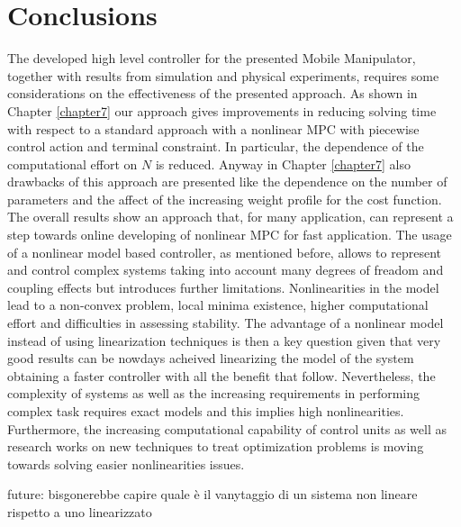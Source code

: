 
\chapter{Conclusions}
\label{conclusions}

The developed high level controller for the presented Mobile Manipulator, together with results from simulation and physical experiments, requires some considerations on the effectiveness of the presented approach. As shown in Chapter \ref{chapter7} our approach gives improvements in reducing solving time with respect to a standard approach with a nonlinear MPC with piecewise control action and terminal constraint. In particular, the dependence of the computational effort on $N$ is reduced. Anyway in Chapter \ref{chapter7} also drawbacks of this approach are presented like the dependence on the number of parameters and the affect of the increasing weight profile for the cost function. The overall results show an approach that, for many application, can represent a step towards online developing of nonlinear MPC for fast application. The usage of a nonlinear model based controller, as mentioned before, allows to represent and control complex systems taking into account many degrees of freadom and coupling effects but introduces further limitations. Nonlinearities in the model lead to a non-convex problem, local minima existence, higher computational effort and difficulties in assessing stability. The advantage of a nonlinear model instead of using linearization techniques is then a key question given that very good results can be nowdays acheived linearizing the model of the system obtaining a faster controller with all the benefit that follow. Nevertheless, the complexity of systems as well as the increasing requirements in performing complex task requires exact models and this implies high nonlinearities. Furthermore, the increasing computational capability of control units as well as research works on new techniques to treat optimization problems is moving towards solving easier nonlinearities issues. 


future: bisgonerebbe capire quale è il vanytaggio di un sistema non lineare rispetto a uno linearizzato